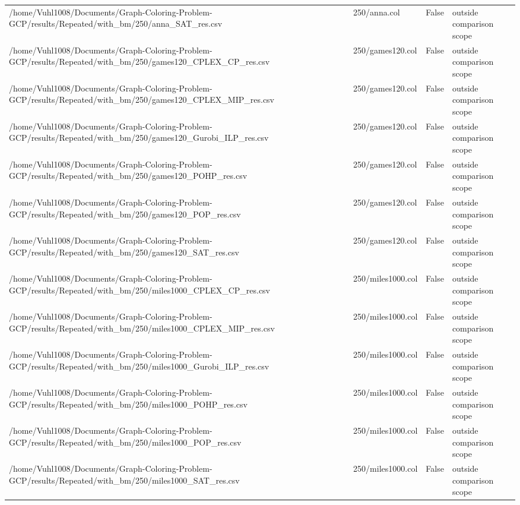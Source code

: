 \begin{table}[htbp]
\begin{tabular}{llll}
/home/Vuhl1008/Documents/Graph-Coloring-Problem-GCP/results/Repeated/with\_bm/250/anna\_SAT\_res.csv & 250/anna.col & False & outside comparison scope \\
/home/Vuhl1008/Documents/Graph-Coloring-Problem-GCP/results/Repeated/with\_bm/250/games120\_CPLEX\_CP\_res.csv & 250/games120.col & False & outside comparison scope \\
/home/Vuhl1008/Documents/Graph-Coloring-Problem-GCP/results/Repeated/with\_bm/250/games120\_CPLEX\_MIP\_res.csv & 250/games120.col & False & outside comparison scope \\
/home/Vuhl1008/Documents/Graph-Coloring-Problem-GCP/results/Repeated/with\_bm/250/games120\_Gurobi\_ILP\_res.csv & 250/games120.col & False & outside comparison scope \\
/home/Vuhl1008/Documents/Graph-Coloring-Problem-GCP/results/Repeated/with\_bm/250/games120\_POHP\_res.csv & 250/games120.col & False & outside comparison scope \\
/home/Vuhl1008/Documents/Graph-Coloring-Problem-GCP/results/Repeated/with\_bm/250/games120\_POP\_res.csv & 250/games120.col & False & outside comparison scope \\
/home/Vuhl1008/Documents/Graph-Coloring-Problem-GCP/results/Repeated/with\_bm/250/games120\_SAT\_res.csv & 250/games120.col & False & outside comparison scope \\
/home/Vuhl1008/Documents/Graph-Coloring-Problem-GCP/results/Repeated/with\_bm/250/miles1000\_CPLEX\_CP\_res.csv & 250/miles1000.col & False & outside comparison scope \\
/home/Vuhl1008/Documents/Graph-Coloring-Problem-GCP/results/Repeated/with\_bm/250/miles1000\_CPLEX\_MIP\_res.csv & 250/miles1000.col & False & outside comparison scope \\
/home/Vuhl1008/Documents/Graph-Coloring-Problem-GCP/results/Repeated/with\_bm/250/miles1000\_Gurobi\_ILP\_res.csv & 250/miles1000.col & False & outside comparison scope \\
/home/Vuhl1008/Documents/Graph-Coloring-Problem-GCP/results/Repeated/with\_bm/250/miles1000\_POHP\_res.csv & 250/miles1000.col & False & outside comparison scope \\
/home/Vuhl1008/Documents/Graph-Coloring-Problem-GCP/results/Repeated/with\_bm/250/miles1000\_POP\_res.csv & 250/miles1000.col & False & outside comparison scope \\
/home/Vuhl1008/Documents/Graph-Coloring-Problem-GCP/results/Repeated/with\_bm/250/miles1000\_SAT\_res.csv & 250/miles1000.col & False & outside comparison scope \\

\end{tabular}
\end{table}
